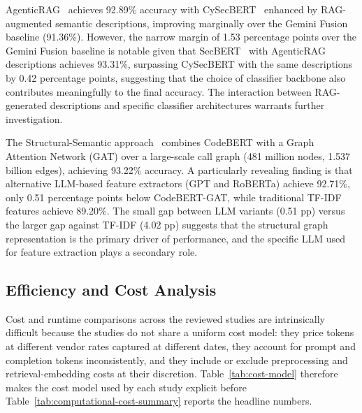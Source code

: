 AgenticRAG~\cite{S2025-kj} achieves 92.89\% accuracy with CySecBERT~\cite{Bayer2024} enhanced by RAG-augmented semantic descriptions, improving marginally over the Gemini Fusion baseline (91.36\%). However, the narrow margin of 1.53 percentage points over the Gemini Fusion baseline is notable given that SecBERT~\cite{Huang2024} with AgenticRAG descriptions achieves 93.31\%, surpassing CySecBERT with the same descriptions by 0.42 percentage points, suggesting that the choice of classifier backbone also contributes meaningfully to the final accuracy. The interaction between RAG-generated descriptions and specific classifier architectures warrants further investigation.

The Structural-Semantic approach~\cite{Khan2024-hy} combines CodeBERT with a Graph Attention Network (GAT) over a large-scale call graph (481 million nodes, 1.537 billion edges), achieving 93.22\% accuracy. A particularly revealing finding is that alternative LLM-based feature extractors (GPT and RoBERTa) achieve 92.71\%, only 0.51 percentage points below CodeBERT-GAT, while traditional TF-IDF features achieve 89.20\%. The small gap between LLM variants (0.51 pp) versus the larger gap against TF-IDF (4.02 pp) suggests that the structural graph representation is the primary driver of performance, and the specific LLM used for feature extraction plays a secondary role.

\subsection{Efficiency and Cost Analysis}

Cost and runtime comparisons across the reviewed studies are intrinsically difficult because the studies do not share a uniform cost model: they price tokens at different vendor rates captured at different dates, they account for prompt and completion tokens inconsistently, and they include or exclude preprocessing and retrieval-embedding costs at their discretion. Table~\ref{tab:cost-model} therefore makes the cost model used by each study explicit before Table~\ref{tab:computational-cost-summary} reports the headline numbers.

